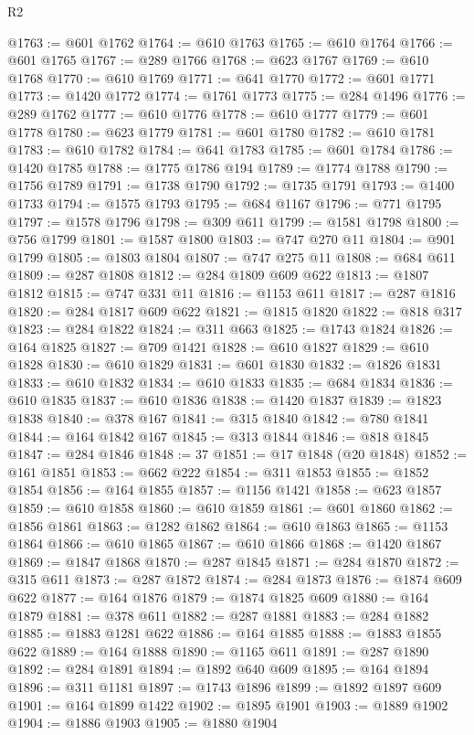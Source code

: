 \begin{lexlean}{R2}
\begin{coremodule}
@1763 := @601 @1762
@1764 := @610 @1763
@1765 := @610 @1764
@1766 := @601 @1765
@1767 := @289 @1766
@1768 := @623 @1767
@1769 := @610 @1768
@1770 := @610 @1769
@1771 := @641 @1770
@1772 := @601 @1771
@1773 := @1420 @1772
@1774 := @1761 @1773
@1775 := @284 @1496
@1776 := @289 @1762
@1777 := @610 @1776
@1778 := @610 @1777
@1779 := @601 @1778
@1780 := @623 @1779
@1781 := @601 @1780
@1782 := @610 @1781
@1783 := @610 @1782
@1784 := @641 @1783
@1785 := @601 @1784
@1786 := @1420 @1785
@1788 := @1775 @1786 @194
@1789 := @1774 @1788
@1790 := @1756 @1789
@1791 := @1738 @1790
@1792 := @1735 @1791
@1793 := @1400 @1733
@1794 := @1575 @1793
@1795 := @684 @1167
@1796 := @771 @1795
@1797 := @1578 @1796
@1798 := @309 @611
@1799 := @1581 @1798
@1800 := @756 @1799
@1801 := @1587 @1800
@1803 := @747 @270 @11
@1804 := @901 @1799
@1805 := @1803 @1804
@1807 := @747 @275 @11
@1808 := @684 @611
@1809 := @287 @1808
@1812 := @284 @1809 @609 @622
@1813 := @1807 @1812
@1815 := @747 @331 @11
@1816 := @1153 @611
@1817 := @287 @1816
@1820 := @284 @1817 @609 @622
@1821 := @1815 @1820
@1822 := @818 @317
@1823 := @284 @1822
@1824 := @311 @663
@1825 := @1743 @1824
@1826 := @164 @1825
@1827 := @709 @1421
@1828 := @610 @1827
@1829 := @610 @1828
@1830 := @610 @1829
@1831 := @601 @1830
@1832 := @1826 @1831
@1833 := @610 @1832
@1834 := @610 @1833
@1835 := @684 @1834
@1836 := @610 @1835
@1837 := @610 @1836
@1838 := @1420 @1837
@1839 := @1823 @1838
@1840 := @378 @167
@1841 := @315 @1840
@1842 := @780 @1841
@1844 := @164 @1842 @167
@1845 := @313 @1844
@1846 := @818 @1845
@1847 := @284 @1846
@1848 := 37
@1851 := @17 @1848 (@20 @1848)
@1852 := @161 @1851
@1853 := @662 @222
@1854 := @311 @1853
@1855 := @1852 @1854
@1856 := @164 @1855
@1857 := @1156 @1421
@1858 := @623 @1857
@1859 := @610 @1858
@1860 := @610 @1859
@1861 := @601 @1860
@1862 := @1856 @1861
@1863 := @1282 @1862
@1864 := @610 @1863
@1865 := @1153 @1864
@1866 := @610 @1865
@1867 := @610 @1866
@1868 := @1420 @1867
@1869 := @1847 @1868
@1870 := @287 @1845
@1871 := @284 @1870
@1872 := @315 @611
@1873 := @287 @1872
@1874 := @284 @1873
@1876 := @1874 @609 @622
@1877 := @164 @1876
@1879 := @1874 @1825 @609
@1880 := @164 @1879
@1881 := @378 @611
@1882 := @287 @1881
@1883 := @284 @1882
@1885 := @1883 @1281 @622
@1886 := @164 @1885
@1888 := @1883 @1855 @622
@1889 := @164 @1888
@1890 := @1165 @611
@1891 := @287 @1890
@1892 := @284 @1891
@1894 := @1892 @640 @609
@1895 := @164 @1894
@1896 := @311 @1181
@1897 := @1743 @1896
@1899 := @1892 @1897 @609
@1901 := @164 @1899 @1422
@1902 := @1895 @1901
@1903 := @1889 @1902
@1904 := @1886 @1903
@1905 := @1880 @1904

\end{coremodule}
\end{lexlean}
